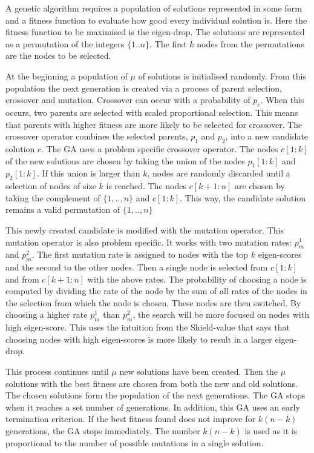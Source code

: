 \documentclass[11pt]{article}
\theoremstyle{definition}
\begin{document}
A genetic algorithm requires a population of solutions represented in some form and a fitness function to evaluate how good every individual solution is.
Here the fitness function to be maximised is the eigen-drop. The solutions are represented as a permutation of the integers $\{1..n\}$. The first $k$ nodes from the permutations are the nodes to be selected.

At the beginning a population of $\mu$ of solutions is initialised randomly. From this population the next generation is created via a process of parent selection, crossover and mutation. Crossover can occur with a probability of $p_c$. When this occurs, two parents are selected with scaled proportional selection. This means that parents with higher fitness are more likely to be selected for crossover. The crossover operator combines the selected parents, $p_1$ and $p_2$, into a new candidate solution $c$. The GA uses a problem specific crossover operator. The nodes $c[1:k]$ of the new solutions are chosen by taking the union of the nodes $p_1[1:k]$ and $p_2[1:k]$. If this union is larger than $k$, nodes are randomly discarded until a selection of nodes of size $k$ is reached. The nodes $c[k+1:n]$ are chosen by taking the complement of $\{1,..,n\}$ and $c[1:k]$. This way, the candidate solution remains a valid permutation of $\{1,..,n\}$ 

This newly created candidate is modified with the mutation operator. This mutation operator is also problem specific. It works with two mutation rates: $p_m^1$ and $p_m^2$. The first mutation rate is assigned to nodes with the top $k$ eigen-scores and the second to the other nodes. Then a single node is selected from $c[1:k]$ and from $c[k+1:n]$ with the above rates. The probability of choosing a node is computed by dividing the rate of the node by the sum of all rates of the nodes in the selection from which the node is chosen. These nodes are then switched. By choosing a higher rate $p_m^1$ than $p_m^2$, the search will be more focused on nodes with high eigen-score. This uses the intuition from the Shield-value that says that choosing nodes with high eigen-scores is more likely to result in a larger eigen-drop. 

This process continues until $\mu$ new solutions have been created. Then the $\mu$ solutions with the best fitness are chosen from both the new and old solutions. The chosen solutions form the population of the next generations. The GA stops when it reaches a set number of generations. In addition, this GA uses an early termination criterion. If the best fitness found does not improve for $k(n-k)$ generations, the GA stops immediately. The number $k(n-k)$ is used as it is proportional to the number of possible mutations in a single solution.
\end{document}
